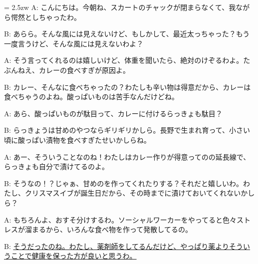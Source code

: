 \documentclass[11pt]{amsart}
\title{}
\author{}
\newenvironment{hangall}[1]{\hangindent = 2.5zw\everypar{\hangindent = 2.5zw}}{}
\begin{document}
\maketitle
\begin{hangall}{}%
A: こんにちは。今朝ね、スカートのチャックが閉まらなくて、我ながら愕然としちゃったわ。

B: あらら。そんな風には見えないけど、もしかして、最近太っちゃった？もう一度言うけど、そんな風には見えないわよ？

A: そう言ってくれるのは嬉しいけど、体重を聞いたら、絶対のけぞるわよ。たぶんねえ、カレーの食べすぎが原因よ。

B: カレー、そんなに食べちゃったの？わたしも辛い物は得意だから、カレーは食べちゃうのよね。酸っぱいものは苦手なんだけどね。

A: あら、酸っぱいものが駄目って、カレーに付けるらっきょも駄目？

B: らっきょうは甘めのやつならギリギリかしら。長野で生まれ育って、小さい頃に酸っぱい漬物を食べすぎたせいかしらね。

A: あー、そういうことなのね！わたしはカレー作りが得意ってのの延長線で、らっきょも自分で漬けてるのよ。

B: そうなの！？じゃぁ、甘めのを作ってくれたりする？それだと嬉しいわ。わたし、クリスマスイブが誕生日だから、その時までに漬けておいてくれないかしら？

A: もちろんよ、おすそ分けするわ。ソーシャルワーカーをやってると色々ストレスが溜まるから、いろんな食べ物を作って発散してるの。

B: \ul{そうだったのね。わたし、薬剤師をしてるんだけど、やっぱり薬よりそういうことで健康を保った方が良いと思うわ。}\end{hangall}
\end{document}
